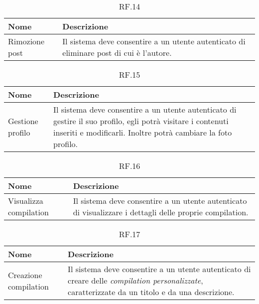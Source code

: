 \documentclass{natourDoc}
\begin{document}
	\begin{table}[H]
		\centering
		\begin{tabular}{ |p{5cm}|p{10.3cm}| }
			\hline
			\rowcolor{PineGreen!70}
			\textbf{Nome} & \textbf{Descrizione} \\
			\hline
			Rimozione post & Il sistema deve consentire a un utente autenticato di eliminare post di cui
			è l'autore. \\
			\hline
		\end{tabular}
		\caption{RF.14}
		\label{table:14}
	\end{table}

	\begin{table}[H]
		\centering
		\begin{tabular}{ |p{5cm}|p{10.3cm}| } 
			\hline
			\rowcolor{PineGreen!70}
			\textbf{Nome} & \textbf{Descrizione} \\
			\hline
			Gestione profilo &  Il sistema deve consentire a un utente autenticato di gestire il suo profilo, 
			egli potrà visitare i contenuti inseriti e modificarli. Inoltre potrà cambiare la foto profilo. \\
			\hline
		\end{tabular}
		\caption{RF.15}
		\label{table:15}
	\end{table}
	

	\begin{table}[H]
		\centering
		\begin{tabular}{ |p{5cm}|p{10.3cm}| }
			\hline
			\rowcolor{PineGreen!70}
			\textbf{Nome} & \textbf{Descrizione} \\
			\hline
			Visualizza compilation & Il sistema deve consentire a un utente autenticato di visualizzare i dettagli
			delle proprie compilation.  \\
			\hline
		\end{tabular}
		\caption{RF.16}
		\label{table:16}
	\end{table}

	\begin{table}[H]
		\centering
		\begin{tabular}{ |p{5cm}|p{10.3cm}| }
			\hline
			\rowcolor{PineGreen!70}
			\textbf{Nome} & \textbf{Descrizione} \\
			\hline
			Creazione compilation & Il sistema deve consentire a un utente autenticato di creare delle \textit{compilation personalizzate},
			caratterizzate da un titolo e da una descrizione. \\
			\hline
		\end{tabular}
		\caption{RF.17}
		\label{table:17}
	\end{table}
\end{document}
